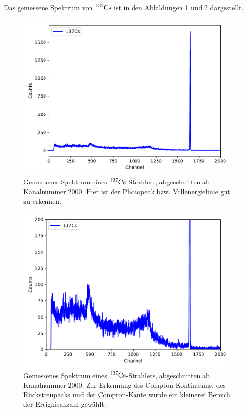 Das gemessene Spektrum von $\ce{^{137}Cs}$ ist in den Abbildungen \ref{fig:plot2} und \ref{fig:plot21} dargestellt.

\begin{figure}
  \centering
  \includegraphics{content/plot2.pdf}
  \caption{Gemessenes Spektrum eines $\ce{^{137}Cs}$-Strahlers, abgeschnitten ab Kanalnummer $\num{2000}$. Hier ist der
  Photopeak bzw. Vollenergielinie gut zu erkennen.}
  \label{fig:plot2}
\end{figure}

\begin{figure}
  \centering
  \includegraphics{content/plot21.pdf}
  \caption{Gemessenes Spektrum eines $\ce{^{137}Cs}$-Strahlers, abgeschnitten ab Kanalnummer $\num{2000}$. Zur Erkennung
    des Compton-Kontinuums, des Rückstreupeaks und der Compton-Kante wurde ein kleinerer Bereich der Ereignisanzahl gewählt.}
  \label{fig:plot21}
\end{figure}

